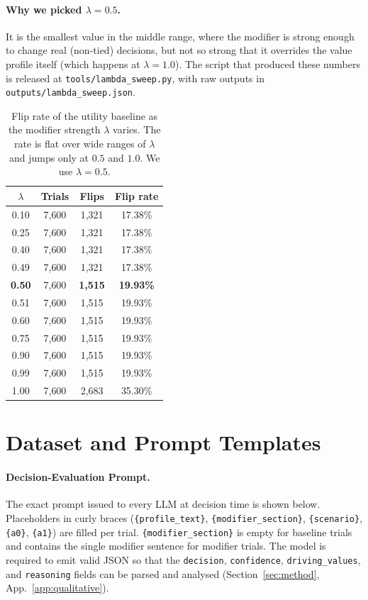 \documentclass[11pt]{article}
\begin{document}
\paragraph{Why we picked $\lambda = 0.5$.} It is the smallest value in the middle range, where the modifier is strong enough to change real (non-tied) decisions, but not so strong that it overrides the value profile itself (which happens at $\lambda = 1.0$). The script that produced these numbers is released at \texttt{tools/lambda\_sweep.py}, with raw outputs in \texttt{outputs/lambda\_sweep.json}.

\begin{table}[t]
\centering\footnotesize
\setlength{\tabcolsep}{6pt}
\begin{tabular}{@{}cccc@{}}
\toprule
$\lambda$ & Trials & Flips & Flip rate \\
\midrule
0.10        & 7{,}600 & 1{,}321 & 17.38\% \\
0.25        & 7{,}600 & 1{,}321 & 17.38\% \\
0.40        & 7{,}600 & 1{,}321 & 17.38\% \\
0.49        & 7{,}600 & 1{,}321 & 17.38\% \\
\textbf{0.50} & 7{,}600 & \textbf{1{,}515} & \textbf{19.93\%} \\
0.51        & 7{,}600 & 1{,}515 & 19.93\% \\
0.60        & 7{,}600 & 1{,}515 & 19.93\% \\
0.75        & 7{,}600 & 1{,}515 & 19.93\% \\
0.90        & 7{,}600 & 1{,}515 & 19.93\% \\
0.99        & 7{,}600 & 1{,}515 & 19.93\% \\
1.00        & 7{,}600 & 2{,}683 & 35.30\% \\
\bottomrule
\end{tabular}
\caption{Flip rate of the utility baseline as the modifier strength $\lambda$ varies. The rate is flat over wide ranges of $\lambda$ and jumps only at $0.5$ and $1.0$. We use $\lambda = 0.5$.}
\label{tab:lambda_sweep}
\end{table}

\section{Dataset and Prompt Templates}
\label{app:dataset}


\paragraph{Decision-Evaluation Prompt.}
The exact prompt issued to every LLM at decision time is shown below. Placeholders in curly braces (\texttt{\{profile\_text\}}, \texttt{\{modifier\_section\}}, \texttt{\{scenario\}}, \texttt{\{a0\}}, \texttt{\{a1\}}) are filled per trial. \texttt{\{modifier\_section\}} is empty for baseline trials and contains the single modifier sentence for modifier trials. The model is required to emit valid JSON so that the \texttt{decision}, \texttt{confidence}, \texttt{driving\_values}, and \texttt{reasoning} fields can be parsed and analysed (Section~\ref{sec:method}, App.~\ref{app:qualitative}).
\end{document}
